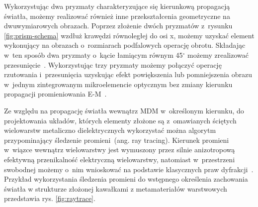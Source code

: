 Wykorzystując dwa pryzmaty charakteryzujące się kierunkową propagacją światła, możemy realizować również inne przekształcenia geometryczne na dwuwymiarowych obrazach. Poprzez złożenie dwóch pryzmatów z~rysunku \ref{fig:prism-schema} wzdłuż krawędzi równoległej do osi x, możemy uzyskać element wykonujący na obrazach o~rozmiarach podfalowych operację obrotu. Składając w~ten sposób dwa pryzmaty o~kącie łamiącym równym 45$^\circ$ możemy zrealizować przesunięcie~\cite{Zhao:08,barros2016two}. Wykorzystując trzy pryzmaty możemy połączyć operację rzutowania i~przesunięcia uzyskując efekt powiększenia lub pomniejszenia obrazu w~jednym zintegrowanym mikroelemencie optycznym bez zmiany kierunku propagacji promieniowania E-M~\cite{Zhao:08}.

Ze względu na propagację światła wewnątrz MDM w~określonym kierunku, do projektowania układów, których elementy złożone są z~omawianych ściętych wielowarstw metaliczno dielektrycznych wykorzystać można algorytm przypominający śledzenie promieni~(ang. ray tracing). Kierunek promieni w~wiązce wewnątrz wielowarstwy jest wymuszony  przez silnie anizotropową efektywną przenikalność elektryczną wielowarstwy, natomiast w~przestrzeni swobodnej możemy o~nim wnioskować na podstawie klasycznych praw dyfrakcji~\cite{pastuszczak2011slanted}. Przykład wykorzystania śledzenia promieni do wstępnego określenia zachowania światła w strukturze złożonej kawałkami z metamateriałów warstwowych przedstawia rys. \ref{fig:raytrace}.

